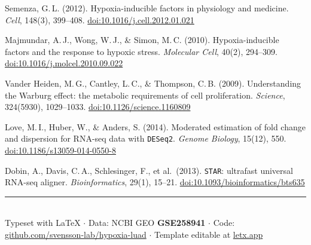 \documentclass[11pt, a4paper]{article}
\newcommand{\tool}[1]{\texttt{#1}}
\begin{document}
\begingroup
\small
\setlength{\parskip}{3pt}
\begin{enumerate}[label={[\arabic*]}, leftmargin=*, itemsep=2pt]

\item Semenza, G.\,L. (2012). Hypoxia-inducible factors in physiology and medicine.
\textit{Cell}, 148(3), 399--408.
\href{https://doi.org/10.1016/j.cell.2012.01.021}{doi:10.1016/j.cell.2012.01.021}

\item Majmundar, A.\,J., Wong, W.\,J., \& Simon, M.\,C. (2010).
Hypoxia-inducible factors and the response to hypoxic stress.
\textit{Molecular Cell}, 40(2), 294--309.
\href{https://doi.org/10.1016/j.molcel.2010.09.022}{doi:10.1016/j.molcel.2010.09.022}

\item Vander Heiden, M.\,G., Cantley, L.\,C., \& Thompson, C.\,B. (2009).
Understanding the Warburg effect: the metabolic requirements of cell proliferation.
\textit{Science}, 324(5930), 1029--1033.
\href{https://doi.org/10.1126/science.1160809}{doi:10.1126/science.1160809}

\item Love, M.\,I., Huber, W., \& Anders, S. (2014).
Moderated estimation of fold change and dispersion for RNA-seq data with \tool{DESeq2}.
\textit{Genome Biology}, 15(12), 550.
\href{https://doi.org/10.1186/s13059-014-0550-8}{doi:10.1186/s13059-014-0550-8}

\item Dobin, A., Davis, C.\,A., Schlesinger, F., et al.\ (2013).
\tool{STAR}: ultrafast universal RNA-seq aligner.
\textit{Bioinformatics}, 29(1), 15--21.
\href{https://doi.org/10.1093/bioinformatics/bts635}{doi:10.1093/bioinformatics/bts635}

\end{enumerate}
\endgroup

\vspace{4pt}
\begin{center}
\textcolor{rulegrey}{\rule{0.4\linewidth}{0.5pt}}\\[3pt]
{\scriptsize\color{midgrey}
Typeset with \LaTeX{} $\cdot$ Data: NCBI GEO \textbf{GSE258941}
$\cdot$ Code: \href{https://github.com/svensson-lab/hypoxia-luad}{github.com/svensson-lab/hypoxia-luad}
$\cdot$ Template editable at \href{https://letx.app}{letx.app}}
\end{center}
\end{document}
